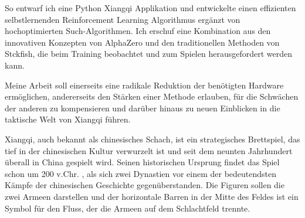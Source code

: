 \documentclass[
  manuscript=article,  %
  layout=publish,  %
  year=2023,
  volume=1,
]{extra/joas}
\begin{document}
So entwarf ich eine Python Xiangqi Applikation und entwickelte einen effizienten selbstlernenden Reinforcement Learning Algorithmus ergänzt von hochoptimierten Such-Algorithmen. Ich erschuf eine Kombination aus den innovativen Konzepten von AlphaZero und den traditionellen Methoden von Stckfish, die beim Training beobachtet und zum Spielen herausgefordert werden kann. 

Meine Arbeit soll einerseits eine radikale Reduktion der benötigten Hardware ermöglichen, andererseits den Stärken einer Methode erlauben, für die Schwächen der anderen zu kompensieren und darüber hinaus zu neuen Einblicken in die taktische Welt von Xiangqi führen.

Xiangqi, auch bekannt als chinesisches Schach, ist ein strategisches Brettspiel, das tief in der chinesischen Kultur verwurzelt ist und seit dem neunten Jahrhundert überall in China gespielt wird. Seinen historischen Ursprung findet das Spiel schon um 200 v.Chr. , als sich zwei Dynastien vor einem der bedeutendsten Kämpfe der chinesischen Geschichte gegenüberstanden. Die Figuren sollen die zwei Armeen darstellen und der horizontale Barren in der Mitte des Feldes ist ein Symbol für den Fluss, der die Armeen auf dem Schlachtfeld trennte. 
\end{document}
